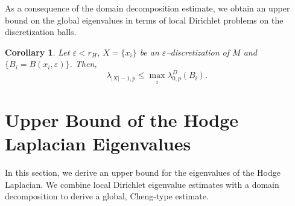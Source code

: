 \documentclass[10 pt, reqno]{amsart}
\newtheorem{corollary}[theorem]{Corollary}
\begin{document}
As a consequence of the domain decomposition estimate, we obtain an upper bound on the global eigenvalues in terms of local Dirichlet problems on the discretization balls.

\begin{corollary}
    \label{cor:upper-bound-max}
Let $\varepsilon<r_H$, $X=\{x_i\}$ be an $\varepsilon$--discretization of $M$ and $\{B_i=B(x_i,\varepsilon)\}$.  Then,
\[\lambda_{|X|-1,p}\leq\max_i\lambda_{0,p}^{D}(B_i).\]
\end{corollary}


\section{Upper Bound of the Hodge Laplacian Eigenvalues}\label{sec:upperbound}
In this section, we derive an upper bound for the eigenvalues of the Hodge Laplacian. We combine local Dirichlet eigenvalue estimates with a domain decomposition to derive a global, Cheng-type estimate.
\end{document}
